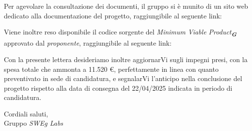 Per agevolare la consultazione dei documenti, il gruppo si è munito di un sito web dedicato alla documentazione del progetto, raggiungibile al seguente link:
\begin{center}
\end{center}
Viene inoltre reso disponibile il codice sorgente del \emph{Minimum Viable Product}\textsubscript{\textit{\textbf{G}}} approvato dal \emph{proponente}, raggiungibile al seguente link: 
\begin{center}
\end{center}
Con la presente lettera desideriamo inoltre aggiornarVi sugli impegni presi, con la spesa totale che ammonta a 11.520 \euro, perfettamente in linea con quanto preventivato in sede di candidatura, e segnalarVi l'anticipo nella conclusione del progetto rispetto alla data di consegna del 22/04/2025 indicata in periodo di candidatura.\\
\vspace{0.5cm}

Cordiali saluti,\\
Gruppo \emph{SWEg Labs}


